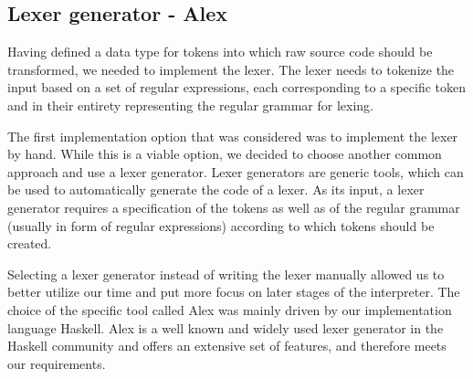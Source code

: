 \subsection{Lexer generator - Alex}
Having defined a data type for tokens into which raw source code should be transformed, we needed to implement the lexer. The lexer needs to tokenize the input based on a set of regular expressions, each corresponding to a specific token and in their entirety representing the regular grammar for lexing.  
\par
The first implementation option that was considered was to implement the lexer by hand. While this is a viable option, we decided to choose another common approach and use a lexer generator. Lexer generators are generic tools, which can be used to automatically generate the code of a lexer. As its input, a lexer generator requires a specification of the tokens as well as of the regular grammar (usually in form of regular expressions) according to which tokens should be created.  
\par
Selecting a lexer generator instead of writing the lexer manually allowed us to better utilize our time and put more focus on later stages of the interpreter. The choice of the specific tool called Alex was mainly driven by our implementation language Haskell. Alex is a well known and widely used lexer generator in the Haskell community and offers an extensive set of features, and therefore meets our requirements. \cite{alexUserGuide}   
